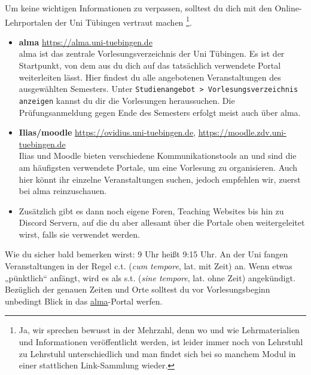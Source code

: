 Um keine wichtigen Informationen zu verpassen, solltest du dich mit den Online-Lehrportalen der Uni Tübingen vertraut machen
\footnote{Ja, wir sprechen bewusst in der Mehrzahl, denn wo und wie Lehrmaterialien und Informationen veröffentlicht werden, ist leider immer noch
von Lehrstuhl zu Lehrstuhl unterschiedlich und man findet sich bei so manchem Modul in einer stattlichen Link-Sammlung wieder.}.
\begin{itemize}
	\item \textbf{\hypertarget{alma}{alma}} \url{https://alma.uni-tuebingen.de} \\
	alma ist das zentrale Vorlesungsverzeichnis der Uni Tübingen. Es ist der Startpunkt, von dem aus du dich auf das tatsächlich verwendete Portal weiterleiten lässt.
	Hier findest du alle angebotenen Veranstaltungen des ausgewählten Semesters. Unter \texttt{Studienangebot > Vorlesungsverzeichnis anzeigen} kannst du dir die Vorlesungen heraussuchen. Die Prüfungsanmeldung gegen Ende des Semesters erfolgt meist auch über alma.
	\item \textbf{Ilias/moodle} \url{https://ovidius.uni-tuebingen.de}, \url{https://moodle.zdv.uni-tuebingen.de} \\
	Ilias und Moodle bieten verschiedene Kommunikationstools an und sind die am häufigsten verwendete Portale, um eine Vorlesung zu organisieren.
	Auch hier könnt ihr einzelne Veranstaltungen suchen, jedoch empfehlen wir, zuerst bei alma reinzuschauen.
	\item Zusätzlich gibt es dann noch eigene Foren, Teaching Websites bis hin zu Discord Servern, auf die du aber allesamt über die Portale oben
	weitergeleitet wirst, falls sie verwendet werden.
\end{itemize}

\ifbachelor \ifmedinfo \pagebreak \fi \fi
\ifbachelor \ifmedien \pagebreak \fi \fi
\ifbachelor \ifbinfo \pagebreak \fi \fi


Wie du sicher bald bemerken wirst: 9 Uhr heißt 9:15 Uhr. An der Uni fangen Veranstaltungen in der Regel c.t. (\textit{cum
tempore}, lat. \glqq mit Zeit\grqq) an. Wenn etwas „pünktlich“ anfängt, wird es als s.t. (\textit{sine tempore}, lat. \glqq ohne
Zeit\grqq) angekündigt.
Bezüglich der genauen Zeiten und Orte solltest du vor Vorlesungsbeginn unbedingt Blick in das \hyperlink{alma}{alma}-Portal werfen.



